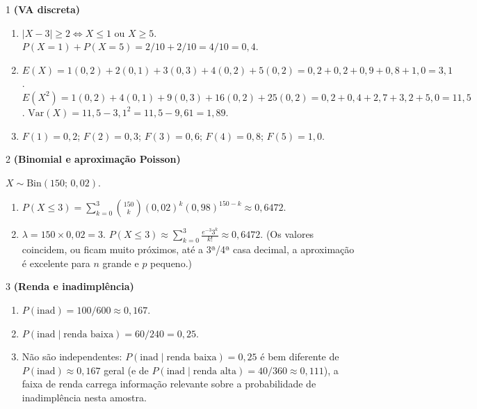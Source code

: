\documentclass[11pt]{article}
\begin{document}

\begin{questao}{1} \textbf{(VA discreta)}
\begin{solucao}
\begin{enumerate}[label=(\alph*)]
  \item $|X-3|\ge2 \Leftrightarrow X\le1 \text{ ou } X\ge5$. $P(X=1)+P(X=5) = 2/10+2/10=4/10=0{,}4$.
  \item $E(X) = 1(0{,}2)+2(0{,}1)+3(0{,}3)+4(0{,}2)+5(0{,}2) = 0{,}2+0{,}2+0{,}9+0{,}8+1{,}0=3{,}1$.
    $E(X^2) = 1(0{,}2)+4(0{,}1)+9(0{,}3)+16(0{,}2)+25(0{,}2) = 0{,}2+0{,}4+2{,}7+3{,}2+5{,}0=11{,}5$.
    $\mathrm{Var}(X) = 11{,}5-3{,}1^2 = 11{,}5-9{,}61=1{,}89$.
  \item $F(1)=0{,}2$; $F(2)=0{,}3$; $F(3)=0{,}6$; $F(4)=0{,}8$; $F(5)=1{,}0$.
\end{enumerate}
\end{solucao}
\end{questao}

\begin{questao}{2} \textbf{(Binomial e aproximação Poisson)}
\begin{solucao}
$X\sim\text{Bin}(150;\,0{,}02)$.
\begin{enumerate}[label=(\alph*)]
  \item $P(X\le3) = \sum_{k=0}^3 \binom{150}{k}(0{,}02)^k(0{,}98)^{150-k} \approx 0{,}6472$.
  \item $\lambda=150\times0{,}02=3$. $P(X\le3)\approx\sum_{k=0}^3 \frac{e^{-3}3^k}{k!} \approx
    0{,}6472$. (Os valores coincidem, ou ficam muito próximos, até a 3ª/4ª casa decimal, a
    aproximação é excelente para $n$ grande e $p$ pequeno.)
\end{enumerate}
\end{solucao}
\end{questao}

\begin{questao}{3} \textbf{(Renda e inadimplência)}
\begin{solucao}
\begin{enumerate}[label=(\alph*)]
  \item $P(\text{inad}) = 100/600 \approx 0{,}167$.
  \item $P(\text{inad}\mid\text{renda baixa}) = 60/240 = 0{,}25$.
  \item Não são independentes: $P(\text{inad}\mid\text{renda baixa})=0{,}25$ é bem diferente de
    $P(\text{inad})\approx0{,}167$ geral (e de $P(\text{inad}\mid\text{renda alta})=40/360\approx
    0{,}111$), a faixa de renda carrega informação relevante sobre a probabilidade de
    inadimplência nesta amostra.
\end{enumerate}
\end{solucao}
\end{questao}
\end{document}
